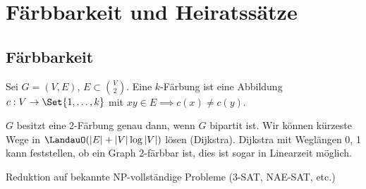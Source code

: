 \chapter{Färbbarkeit und Heiratssätze}


\section{Färbbarkeit}




\begin{df}
    Sei $G = (V, E)$, $E \subset \binom{V}{2}$.
    Eine $k$-Färbung ist eine Abbildung $c: V \to \Set{1, \dotsc, k}$ mit
    \begin{math}
        xy \in E \implies c(x) \neq c(y).
    \end{math}
\end{df}

$G$ besitzt eine 2-Färbung genau dann, wenn $G$ bipartit ist.
Wir können kürzeste Wege in $\LandauO(|E| + |V|\log |V|)$ lösen (Dijkstra).
Dijkstra mit Weglängen 0, 1 kann feststellen, ob ein Graph 2-färbbar ist, dies ist sogar in Linearzeit möglich.

Reduktion auf bekannte NP-vollständige Probleme (3-SAT, NAE-SAT, etc.)

